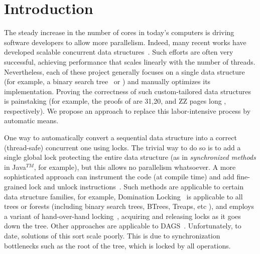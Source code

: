 \section{Introduction} \label{sec:intro}

The steady increase in the number of  cores in today's computers is driving software developers to allow more parallelism. 
Indeed, many recent works have developed scalable concurrent data
structures~\cite{ArbelA2014,DrachslerVY2014,NatarajanM2014,BrownER2014,CrainGR2013,BraginskyP2012,
AfekKKMT2012,EllenFRB2010,BronsonCCO2010,HerlihyLLS2007}.
Such efforts are often very successful, achieving performance that scales linearly with the number of threads. 
Nevertheless, each of these project generally focuses on a single data structure 
(for example, a binary search tree~\cite{citrus} or ) and manually optimizes its implementation. 
Proving the correctness of such custom-tailored data structures is painstaking 
(for example, the proofs of \cite{BraginskyP2012,EllenFRB2010,z} are 31,20, and
ZZ pages long , respectively).
We propose an approach to replace this labor-intensive process by automatic means.

One way to automatically convert a sequential data structure into a correct (thread-safe) concurrent one using locks. 
The trivial way to do so is to add a single global lock protecting the entire data structure 
(as in \emph{synchronized methods} in Java$^{TM}$, for example), but this allows no parallelism whatsoever. 
A more sophisticated approach can instrument the code (at compile time) and add
fine-grained lock and unlock instructions~\cite{Gueta2011,SilberschatzK1980,dag,etc}. Such
methods are applicable to certain data structure families, for example,
Domination Locking~\cite{Gueta2011} is applicable to all trees or forests  
(including binary search trees, BTrees, Treaps, etc ), 
and employs a variant of hand-over-hand locking~\cite{SilberschatzK1980}, 
acquiring and releasing locks as it goes down the tree.  
Other approaches are applicable to DAGS~\cite{dag-locking}. 
Unfortunately, to date, solutions of this sort scale poorly. 
This is due to synchronization bottlenecks such as the root of the tree, 
which is locked by all operations.

